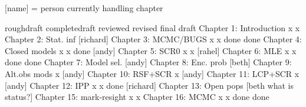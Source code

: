 [name] = person currently handling chapter


                          roughdraft   completedraft  reviewed  revised  final draft
Chapter 1: Introduction       x              x
Chapter 2: Stat. inf        [richard]
Chapter 3: MCMC/BUGS          x              x         done      done
Chapter 4: Closed models      x              x         done     [andy]
Chapter 5: SCR0               x              x        [rahel]
Chapter 6: MLE                x              x         done      done
Chapter 7: Model sel.       [andy]
Chapter 8: Enc. prob        [beth]
Chapter 9: Alt.obs mods       x           [andy]
Chapter 10: RSF+SCR           x           [andy]
Chapter 11: LCP+SCR           x           [andy]
Chapter 12: IPP               x              x         done     [richard]
Chapter 13: Open pops       [beth what is status?]
Chapter 15: mark-resight      x              x        
Chapter 16: MCMC              x              x         done      done


